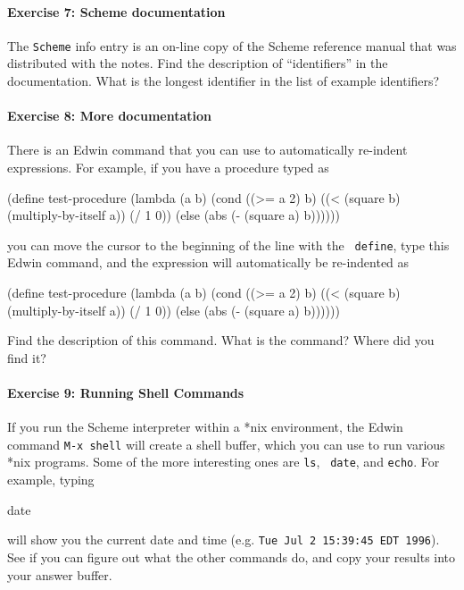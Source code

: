 \paragraph{Exercise 7: Scheme documentation}

The {\tt Scheme} info entry is an on-line copy of the Scheme
reference manual that was distributed with the notes.  Find the
description of ``identifiers'' in the documentation.  What is the
longest identifier in the list of example identifiers?

\paragraph{Exercise 8: More documentation}

There is an Edwin command that you can use to automatically re-indent
expressions.  For example, if you have a procedure typed as

\beginlisp
(define test-procedure
(lambda (a b)
(cond ((>= a 2) b)
   ((< (square b)
 (multiply-by-itself a))
         (/ 1 0))
(else (abs (- (square a) b))))))
\endlisp

\noindent
you can move the cursor to the beginning of the line with the {\tt
define}, type this Edwin command, and the expression will
automatically be re-indented as

\beginlisp
(define test-procedure
  (lambda (a b)
    (cond ((>= a 2) b)
          ((< (square b)
              (multiply-by-itself a))
           (/ 1 0))
          (else (abs (- (square a) b))))))
\endlisp

\noindent
Find the description of this command.  What is the command?  Where did
you find it?

\paragraph{Exercise 9: Running Shell Commands} 

If you run the Scheme interpreter within a *nix environment, the Edwin command 
{\tt M-x shell} will create a shell buffer, which you can use to run 
various *nix programs.  Some of the more interesting ones are {\tt ls}, {\tt
date}, and {\tt echo}.  
For example, typing

\beginlisp
date
\endlisp

\noindent
will show you the current date and time (e.g. {\tt Tue Jul  2 15:39:45 EDT 
1996}). See if you can figure out what the other commands do, and copy your 
results into your answer buffer.


